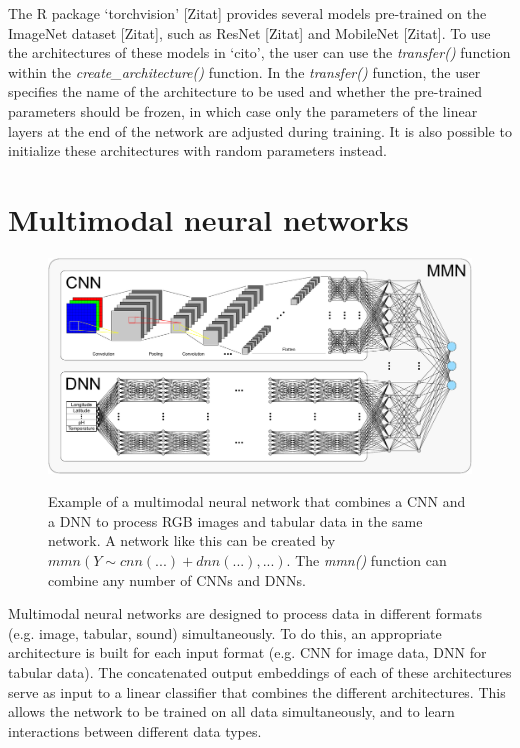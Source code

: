 \documentclass[12pt,twoside]{scrreport}
\newcommand{\pkg}[1]{`#1'}
\newcommand{\fn}[2][]{\textit{#2(}#1\textit{)}}
\begin{document}
The R package \pkg{torchvision} [Zitat] provides several models pre-trained on the ImageNet dataset [Zitat], such as ResNet [Zitat] and MobileNet [Zitat]. To use the architectures of these models in \pkg{cito}, the user can use the \fn{transfer} function within the \fn{create\_architecture} function. In the \fn{transfer} function, the user specifies the name of the architecture to be used and whether the pre-trained parameters should be frozen, in which case only the parameters of the linear layers at the end of the network are adjusted during training. It is also possible to initialize these architectures with random parameters instead.

\section*{Multimodal neural networks}

\begin{figure}
	\includegraphics[width=\textwidth]{MMN.pdf}
	\label{MMN}
	\caption{Example of a multimodal neural network that combines a CNN and a DNN to process RGB images and tabular data in the same network. A network like this can be created by $mmn(Y \sim cnn(...) + dnn(...), ...)$. The \fn{mmn} function can combine any number of CNNs and DNNs.}
\end{figure}

Multimodal neural networks are designed to process data in different formats (e.g. image, tabular, sound) simultaneously. To do this, an appropriate architecture is built for each input format (e.g. CNN for image data, DNN for tabular data). The concatenated output embeddings of each of these architectures serve as input to a linear classifier that combines the different architectures. This allows the network to be trained on all data simultaneously, and to learn interactions between different data types.
\end{document}
